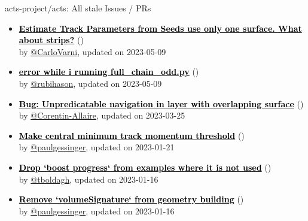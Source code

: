 \begin{frame}[allowframebreaks]{ acts-project/acts: All stale Issues / PRs}
\begin{itemize}
    \item\iss\prstale\textbf{\href{https://github.com/acts-project/acts/issues/1895}{\textcolor{black}{Estimate Track Parameters from Seeds use only one surface. What about strips?}}}
    (\href{https://github.com/acts-project/acts/issues/1895}{}) \\
    by \href{https://github.com/CarloVarni}{@CarloVarni}, updated on 2023-05-09

    \item\iss\prstale\textbf{\href{https://github.com/acts-project/acts/issues/1661}{\textcolor{black}{error while i running full\_chain\_odd.py}}}
    (\href{https://github.com/acts-project/acts/issues/1661}{}) \\
    by \href{https://github.com/rubihason}{@rubihason}, updated on 2023-05-09

    \item\iss\prstale\textbf{\href{https://github.com/acts-project/acts/issues/1852}{\textcolor{black}{Bug: Unpredicatable navigation in layer with overlapping surface}}}
    (\href{https://github.com/acts-project/acts/issues/1852}{}) \\
    by \href{https://github.com/Corentin-Allaire}{@Corentin-Allaire}, updated on 2023-03-25

    \item\iss\prstale\textbf{\href{https://github.com/acts-project/acts/issues/1761}{\textcolor{black}{Make central minimum track momentum threshold}}}
    (\href{https://github.com/acts-project/acts/issues/1761}{}) \\
    by \href{https://github.com/paulgessinger}{@paulgessinger}, updated on 2023-01-21

    \item\iss\prstale\textbf{\href{https://github.com/acts-project/acts/issues/1736}{\textcolor{black}{Drop `boost progress` from examples where it is not used}}}
    (\href{https://github.com/acts-project/acts/issues/1736}{}) \\
    by \href{https://github.com/tboldagh}{@tboldagh}, updated on 2023-01-16

    \item\iss\prstale\textbf{\href{https://github.com/acts-project/acts/issues/1731}{\textcolor{black}{Remove `volumeSignature` from geometry building}}}
    (\href{https://github.com/acts-project/acts/issues/1731}{}) \\
    by \href{https://github.com/paulgessinger}{@paulgessinger}, updated on 2023-01-16


\end{itemize}
\end{frame}
